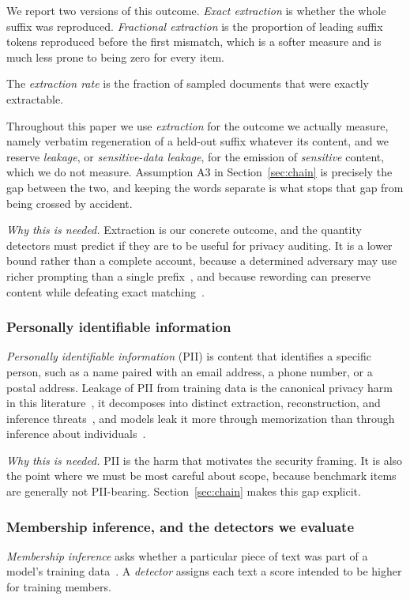 We report two versions of this outcome. \emph{Exact extraction} is whether the whole
suffix was reproduced. \emph{Fractional extraction} is the proportion of leading suffix
tokens reproduced before the first mismatch, which is a softer measure and is much less
prone to being zero for every item.

The \emph{extraction rate} is the fraction of sampled documents that were exactly
extractable.

Throughout this paper we use \emph{extraction} for the outcome we actually measure, namely
verbatim regeneration of a held-out suffix whatever its content, and we reserve
\emph{leakage}, or \emph{sensitive-data leakage}, for the emission of \emph{sensitive}
content, which we do not measure. Assumption A3 in Section~\ref{sec:chain} is precisely
the gap between the two, and keeping the words separate is what stops that gap from being
crossed by accident.

\emph{Why this is needed.} Extraction is our concrete outcome, and the quantity detectors
must predict if they are to be useful for privacy auditing. It is a lower bound rather
than a complete account, because a determined adversary may use richer prompting than a
single prefix~\citep{nasr2025scalable}, and because rewording can preserve content while
defeating exact matching~\citep{ippolito2023verbatim}.

\subsubsection{Personally identifiable information}
\emph{Personally identifiable information} (PII) is content that identifies a specific
person, such as a name paired with an email address, a phone number, or a postal address.
Leakage of PII from training data is the canonical privacy harm in this
literature~\citep{carlini2021extracting}, it decomposes into distinct extraction,
reconstruction, and inference threats~\citep{lukas2023pii}, and models leak it more
through memorization than through inference about
individuals~\citep{huang2022leaking}.

\emph{Why this is needed.} PII is the harm that motivates the security framing. It is
also the point where we must be most careful about scope, because benchmark items are
generally not PII-bearing. Section~\ref{sec:chain} makes this gap explicit.

\subsubsection{Membership inference, and the detectors we evaluate}
\emph{Membership inference} asks whether a particular piece of text was part of a model's
training data~\citep{shokri2017membership}. A \emph{detector} assigns each text a score
intended to be higher for training members.


